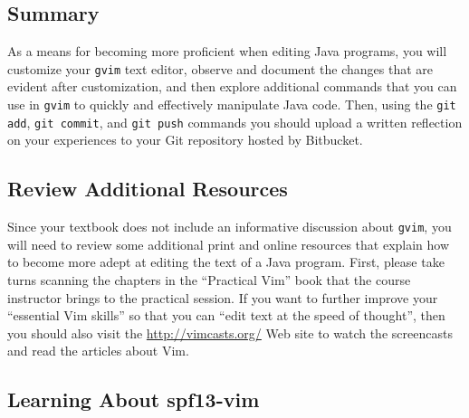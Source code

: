 



\vspace*{-.2in}
\subsection*{Summary}
\vspace*{-.05in}

As a means for becoming more proficient when editing Java programs, you will customize your {\tt gvim} text editor,
observe and document the changes that are evident after customization, and then explore additional commands that you can
use in {\tt gvim} to quickly and effectively manipulate Java code.  Then, using the {\tt git add}, {\tt git commit}, and
{\tt git push} commands you should upload a written reflection on your experiences to your Git repository hosted by
Bitbucket.  

\vspace*{-.15in}
\subsection*{Review Additional Resources}
\vspace*{-.05in}

Since your textbook does not include an informative discussion about {\tt gvim}, you will need to review some additional print
and online resources that explain how to become more adept at editing the text of a Java program.  First, please take
turns scanning the chapters in the ``Practical Vim'' book that the course instructor brings to the practical session. If
you want to further improve your ``essential Vim skills'' so that you can ``edit text at the speed of thought'', then
you should also visit the \url{http://vimcasts.org/} Web site to watch the screencasts and read the articles about Vim.

\vspace*{-.15in}
\subsection*{Learning About spf13-vim} 
\vspace*{-.05in}


